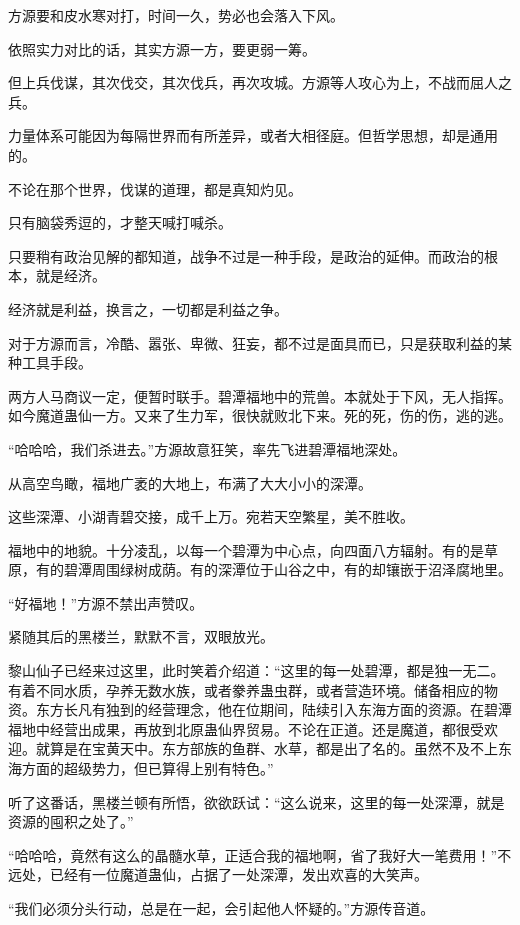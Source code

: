 \begin{this_body}
方源要和皮水寒对打，时间一久，势必也会落入下风。

依照实力对比的话，其实方源一方，要更弱一筹。

但上兵伐谋，其次伐交，其次伐兵，再次攻城。方源等人攻心为上，不战而屈人之兵。

力量体系可能因为每隔世界而有所差异，或者大相径庭。但哲学思想，却是通用的。

不论在那个世界，伐谋的道理，都是真知灼见。

只有脑袋秀逗的，才整天喊打喊杀。

只要稍有政治见解的都知道，战争不过是一种手段，是政治的延伸。而政治的根本，就是经济。

经济就是利益，换言之，一切都是利益之争。

对于方源而言，冷酷、嚣张、卑微、狂妄，都不过是面具而已，只是获取利益的某种工具手段。

两方人马商议一定，便暂时联手。碧潭福地中的荒兽。本就处于下风，无人指挥。如今魔道蛊仙一方。又来了生力军，很快就败北下来。死的死，伤的伤，逃的逃。

“哈哈哈，我们杀进去。”方源故意狂笑，率先飞进碧潭福地深处。

从高空鸟瞰，福地广袤的大地上，布满了大大小小的深潭。

这些深潭、小湖青碧交接，成千上万。宛若天空繁星，美不胜收。

福地中的地貌。十分凌乱，以每一个碧潭为中心点，向四面八方辐射。有的是草原，有的碧潭周围绿树成荫。有的深潭位于山谷之中，有的却镶嵌于沼泽腐地里。

“好福地！”方源不禁出声赞叹。

紧随其后的黑楼兰，默默不言，双眼放光。

黎山仙子已经来过这里，此时笑着介绍道：“这里的每一处碧潭，都是独一无二。有着不同水质，孕养无数水族，或者豢养蛊虫群，或者营造环境。储备相应的物资。东方长凡有独到的经营理念，他在位期间，陆续引入东海方面的资源。在碧潭福地中经营出成果，再放到北原蛊仙界贸易。不论在正道。还是魔道，都很受欢迎。就算是在宝黄天中。东方部族的鱼群、水草，都是出了名的。虽然不及不上东海方面的超级势力，但已算得上别有特色。”

听了这番话，黑楼兰顿有所悟，欲欲跃试：“这么说来，这里的每一处深潭，就是资源的囤积之处了。”

“哈哈哈，竟然有这么的晶髓水草，正适合我的福地啊，省了我好大一笔费用！”不远处，已经有一位魔道蛊仙，占据了一处深潭，发出欢喜的大笑声。

“我们必须分头行动，总是在一起，会引起他人怀疑的。”方源传音道。


\end{this_body}
